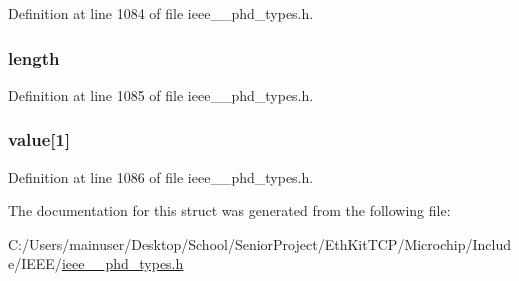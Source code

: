 Definition at line 1084 of file ieee\+\_\+\_\+phd\+\_\+types.\+h.

\hypertarget{struct___simple_nu_obs_value_cmp_a3743679e4ff85e3e1b3fc2e59973fbb3}{}
\subsubsection[{length}]{ length}\label{struct___simple_nu_obs_value_cmp_a3743679e4ff85e3e1b3fc2e59973fbb3}


Definition at line 1085 of file ieee\+\_\+\_\+phd\+\_\+types.\+h.

\hypertarget{struct___simple_nu_obs_value_cmp_af23e5cfe90144c672a660defcb9d52b9}{}
\subsubsection[{value}]{ value\mbox{[}1\mbox{]}}\label{struct___simple_nu_obs_value_cmp_af23e5cfe90144c672a660defcb9d52b9}


Definition at line 1086 of file ieee\+\_\+\_\+phd\+\_\+types.\+h.



The documentation for this struct was generated from the following file\+:\begin{DoxyCompactItemize}
\item 
C\+:/\+Users/mainuser/\+Desktop/\+School/\+Senior\+Project/\+Eth\+Kit\+T\+C\+P/\+Microchip/\+Include/\+I\+E\+E\+E/\hyperlink{ieee__11073__phd__types_8h}{ieee\+\_\+\_\+phd\+\_\+types.\+h}\end{DoxyCompactItemize}
